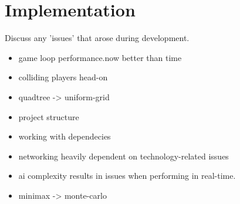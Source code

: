 \documentclass{standalone}
\begin{document}
	\section{Implementation}
		Discuss any 'issues' that arose during development.

		\begin{itemize}
			\item game loop performance.now better than time
			\item colliding players head-on
			\item quadtree -> uniform-grid
			\item project structure
			\item working with dependecies
			\item networking heavily dependent on technology-related issues
			\item ai complexity results in issues when performing in real-time.
			\item minimax -> monte-carlo
		\end{itemize}
\end{document}
